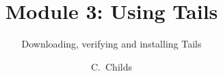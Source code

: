 \documentclass{beamer}
\title[Module 3: Tails]
{Module 3: Using Tails}
\subtitle{Downloading, verifying and installing Tails}
\author[C. Childs]
{C.~Childs\inst{1}}
\institute[Tor Project]
{
  \inst{1}
  Support assistant / Translation coordinator\\
  The Tor Project
}
\begin{document}
\frame{\titlepage}

\begin{frame}
\frametitle{}
	\begin{block}{}
	\end{block}
\end{frame}

\begin{frame}
\frametitle{}
        \begin{block}{}
        \end{block}
\end{frame}

\begin{frame}
\frametitle{}
        \begin{block}{}
        \end{block}
\end{frame}

\begin{frame}
\frametitle{}
        \begin{block}{}
        \end{block}
\end{frame}

\begin{frame}
\frametitle{}
        \begin{block}{}
        \end{block}
\end{frame}

\begin{frame}
\frametitle{}
        \begin{block}{}
        \end{block}
\end{frame}

\begin{frame}
\frametitle{}
        \begin{block}{}
        \end{block}
\end{frame}

\begin{frame}
\frametitle{}
        \begin{block}{}
        \end{block}
\end{frame}

\begin{frame}
\frametitle{}
        \begin{block}{}
        \end{block}
\end{frame}

\begin{frame}
\frametitle{}
        \begin{block}{}
        \end{block}
\end{frame}

\begin{frame}
\frametitle{}
        \begin{block}{}
        \end{block}
\end{frame}
\end{document}
